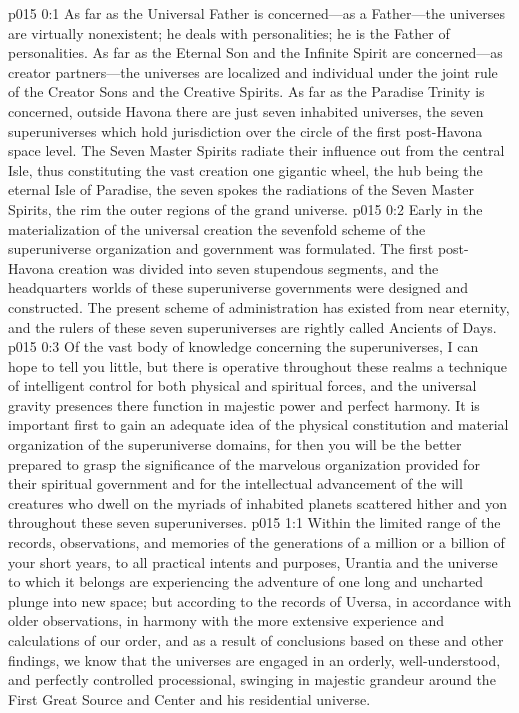 \author{Universal Censor}
\vs p015 0:1 As far as the Universal Father is con\-cerned---as a Father---the universes are virtually nonexistent; he deals with personalities; he is the Father of personalities. As far as the Eternal Son and the Infinite Spirit are concerned---as creator partners---the universes are localized and individual under the joint rule of the Creator Sons and the Creative Spirits. As far as the Paradise Trinity is concerned, outside Havona there are just seven inhabited universes, the seven superuniverses which hold jurisdiction over the circle of the first post\hyp{}Havona space level. The Seven Master Spirits radiate their influence out from the central Isle, thus constituting the vast creation one gigantic wheel, the hub being the eternal Isle of Paradise, the seven spokes the radiations of the Seven Master Spirits, the rim the outer regions of the grand universe.
\vs p015 0:2 Early in the materialization of the universal creation the sevenfold scheme of the superuniverse organization and government was formulated. The first post\hyp{}Havona creation was divided into seven stupendous segments, and the headquarters worlds of these superuniverse governments were designed and constructed. The present scheme of administration has existed from near eternity, and the rulers of these seven superuniverses are rightly called Ancients of Days.
\vs p015 0:3 Of the vast body of knowledge concerning the superuniverses, I can hope to tell you little, but there is operative throughout these realms a technique of intelligent control for both physical and spiritual forces, and the universal gravity presences there function in majestic power and perfect harmony. It is important first to gain an adequate idea of the physical constitution and material organization of the superuniverse domains, for then you will be the better prepared to grasp the significance of the marvelous organization provided for their spiritual government and for the intellectual advancement of the will creatures who dwell on the myriads of inhabited planets scattered hither and yon throughout these seven superuniverses.
\vs p015 1:1 Within the limited range of the records, observations, and memories of the generations of a million or a billion of your short years, to all practical intents and purposes, Urantia and the universe to which it belongs are experiencing the adventure of one long and uncharted plunge into new space; but according to the records of Uversa, in accordance with older observations, in harmony with the more extensive experience and calculations of our order, and as a result of conclusions based on these and other findings, we know that the universes are engaged in an orderly, well\hyp{}understood, and perfectly controlled processional, swinging in majestic grandeur around the First Great Source and Center and his residential universe.
